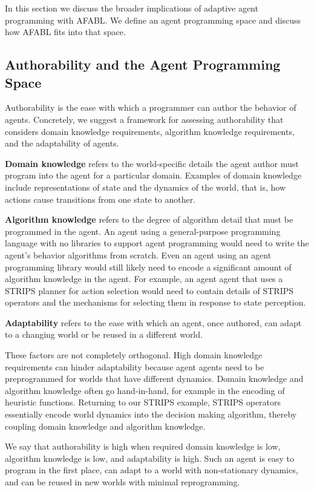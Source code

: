 In this section we discuss the broader implications of adaptive agent programming with AFABL. We define an agent programming space and discuss how AFABL fits into that space.

\subsection{Authorability and the Agent Programming Space}

Authorability is the ease with which a programmer can author the behavior of agents.  Concretely, we suggest a framework for assessing authorability that considers domain knowledge requirements, algorithm knowledge requirements, and the adaptability of agents.

{\bf Domain knowledge} refers to the world-specific details the agent author must program into the agent for a particular domain.  Examples of domain knowledge include representations of state and the dynamics of the world, that is, how actions cause transitions from one state to another.

{\bf Algorithm knowledge} refers to the degree of algorithm detail that must be programmed in the agent.  An agent using a general-purpose programming language with no libraries to support agent programming would need to write the agent's behavior algorithms from scratch. Even an agent using an agent programming library would still likely need to encode a significant amount of algorithm knowledge in the agent. For example, an agent agent that uses a STRIPS planner for action selection would need to contain details of STRIPS operators and the mechanisms for selecting them in response to state perception.

{\bf Adaptability} refers to the ease with which an agent, once authored, can adapt to a changing world or be reused in a different world.

These factors are not completely orthogonal.  High domain knowledge requirements can hinder adaptability because agent agents need to be preprogrammed for worlds that have different dynamics.  Domain knowledge and algorithm knowledge often go hand-in-hand, for example in the encoding of heuristic functions.  Returning to our STRIPS example, STRIPS operators essentially encode world dynamics into the decision making algorithm, thereby coupling domain knowledge and algorithm knowledge.

We say that authorability is high when required domain knowledge is low, algorithm knowledge is low, and adaptability is high.  Such an agent is easy to program in the first place, can adapt to a world with non-stationary dynamics, and can be reused in new worlds with minimal reprogramming.

